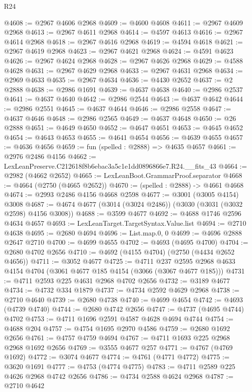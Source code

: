 \begin{lexlean}{R24}
\begin{coremodule}
@4608 := @2967 @4606 @2968
@4609 := @4600 @4608
@4611 := @2967 @4609 @2968
@4613 := @2967 @4611 @2968
@4614 := @4597 @4613
@4616 := @2967 @4614 @2968
@4618 := @2967 @4616 @2968
@4619 := @4594 @4618
@4621 := @2967 @4619 @2968
@4623 := @2967 @4621 @2968
@4624 := @4591 @4623
@4626 := @2967 @4624 @2968
@4628 := @2967 @4626 @2968
@4629 := @4588 @4628
@4631 := @2967 @4629 @2968
@4633 := @2967 @4631 @2968
@4634 := @2969 @4633
@4635 := @2967 @4634
@4636 := @4430 @2652
@4637 := @2 @2888
@4638 := @2986 @1691
@4639 := @4637 @4638
@4640 := @2986 @2537
@4641 := @4637 @4640
@4642 := @2986 @2544
@4643 := @4637 @4642
@4644 := @2986 @2551
@4645 := @4637 @4644
@4646 := @2986 @2558
@4647 := @4637 @4646
@4648 := @2986 @2565
@4649 := @4637 @4648
@4650 := @26 @2888
@4651 := @4649 @4650
@4652 := @4647 @4651
@4653 := @4645 @4652
@4654 := @4643 @4653
@4655 := @4641 @4654
@4656 := @4639 @4655
@4657 := @4636 @4656
@4659 := fun (spelled : @2888) => @4635 @4657
@4661 := @2976 @2486 @4156
@4662 := LexLeanPreserve.C212618f8b6ebac3a5c1e1dd0896866e7.R24.__fits_43
@4664 := @2982 (@4662 @2652)
@4665 := LexLeanBoot.GrammarProof.separator
@4668 := @4664 (@2750 (@4665 @2652))
@4670 := (spelled : @2888) -> @4661 @4668
@4674 := @2993 @2486 @4156 @4668 @2598
@4677 := @3001 (@3005 @4154) @3008
@4687 := @4674 @4677 (@3014 (@3024 @2486)) (@3030 (@3031 (@3032 @2598) @4156 @3008))
@4688 := @3599 @4677
@4692 := @4688 @1746 @2596 @4634 @4657
@4693 := LexLeanTarget.TargetSyntax.Value.list
@4694 := @2710 @4638
@4695 := @2680 @4694
@4696 := List.map.{0, 0}
@4699 := @4696 @2888 @2647 @2710
@4700 := @4699 @4655
@4702 := @4693 (@4695 @4700)
@4704 := @2680 @4702 @2656
@4710 := @4692 (@4155 @4704) (@2750 (@4434 @2652 @4656))
@4711 := @3052 @4677
@4725 := @4711
    @237
    @2595
    @2968
    @4633
    @4154
    @4704
    (@3061 @4677 @185 @4154 (@3066 (@3067 @4677 @185)))
@4731 := @4711 @2593 @225 @4631 @2968 @4702 @2656
@4732 := @3189 @4677
@4734 := @4732 @334 @1879
@4737 := @4734 @2592 @4629 @2968
@4738 := @2710 @4640
@4739 := @2680 @4738
@4740 := @4699 @4654
@4742 := @4693 (@4739 @4740)
@4744 := @2680 @4742 @2656
@4747 := @4737 (@4695 @4744) @4702
@4753 := @4711 @1696 @2591 @4587 @4628 @4694 @4744
@4754 := @4688 @204
@4757 := @4754 @1695 @2970 @4586
@4759 := @2680 @1692 @2656
@4761 := @4757 @4759 @4694
@4767 := @4711 @1693 @225 @2968 @2968 @1692 @2656
@4769 := @3555 @4677 @257
@4771 := @4767 (@4769 @1692)
@4772 := @3074 @4677
@4774 := @4761 (@4771 @4772)
@4775 := @3620 @1691
@4777 := @4753 (@4774 @4775)
@4783 := @4711 @2589 @225 @4626 @2968 @4742 @2656
@4786 := @4734 @2588 @4624 @2968
@4787 := @2710 @4642

\end{coremodule}
\end{lexlean}
